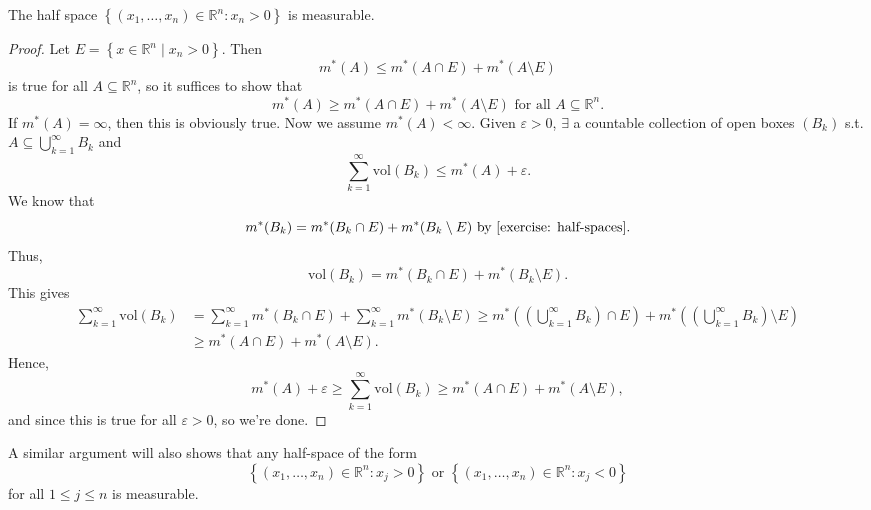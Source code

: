 \begin{lemma} \label{lm: Half-spaces are measurable}
    The half space \(\left\{ (x_1, \dots , x_n) \in \mathbb{R} ^n : x_n > 0 \right\} \) is measurable. 
\end{lemma}

\begin{proof}
    Let \(E = \left\{ x \in \mathbb{R} ^n \mid x_n > 0 \right\} \). Then 
    \[
        m^*(A) \le m^*(A \cap E) + m^*(A \setminus E)
    \] 
    is true for all \(A \subseteq \mathbb{R} ^n\), so it suffices to show that 
    \[
        m^*(A) \ge m^*(A \cap E) + m^*(A \setminus E) \text{ for all } A \subseteq \mathbb{R}^n. 
    \]
    If \(m^*(A) = \infty\), then this is obviously true. Now we assume \(m^*(A) < \infty\). Given \(\varepsilon > 0\), \(\exists \) a countable collection of open boxes \((B_k)\) s.t. \(A \subseteq \bigcup_{k=1}^{\infty} B_k \) and 
    \[
        \sum_{k=1}^{\infty} \mathrm{vol} (B_k) \le m^*(A) + \varepsilon.  
    \]
    We know that 
    \[
        m^*(B_k) = m^*(B_k \cap E) + m^*(B_k \setminus E) \text{ by \autoref{exercise: half-spaces}.} 
    \]      
    Thus,
    \[
        \mathrm{vol} (B_k) = m^*(B_k \cap E) + m^*(B_k \setminus E). 
    \]
    This gives 
    \begin{align*}
        \sum_{k=1}^{\infty} \mathrm{vol} (B_k) &= \sum_{k=1}^{\infty} m^*(B_k \cap E) + \sum_{k=1}^{\infty} m^*(B_k \setminus E) \ge m^* \left( \left( \bigcup_{k=1}^{\infty} B_k \right) \cap E   \right) + m^* \left( \left( \bigcup_{k=1}^{\infty} B_k  \right) \setminus E \right) \\
        &\ge m^* (A \cap E) + m^*(A \setminus E).
    \end{align*}
    Hence,
    \[
        m^*(A) + \varepsilon \ge \sum_{k=1}^{\infty} \mathrm{vol} (B_k) \ge m^*(A \cap E) + m^*(A \setminus E), 
    \]
    and since this is true for all \(\varepsilon > 0\), so we're done.
\end{proof}

\begin{remark}
    A similar argument will also shows that any half-space of the form
    \[
        \left\{ (x_1, \dots , x_n) \in \mathbb{R} ^n: x_j > 0 \right\} \text{ or } \left\{ (x_1, \dots , x_n) \in \mathbb{R} ^n: x_j < 0 \right\} 
    \]
    for all \(1 \le j \le n\) is measurable.   
\end{remark}

